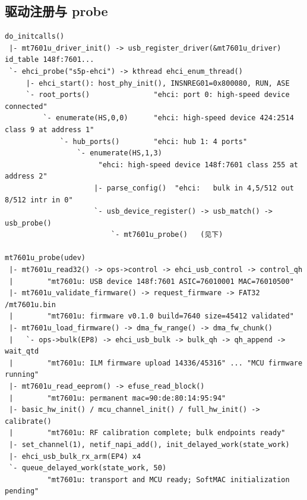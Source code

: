 \subsection{驱动注册与 probe}
\begin{lstlisting}
do_initcalls()
 |- mt7601u_driver_init() -> usb_register_driver(&mt7601u_driver)   id_table 148f:7601...
 `- ehci_probe("s5p-ehci") -> kthread ehci_enum_thread()
     |- ehci_start(): host_phy_init(), INSNREG01=0x800080, RUN, ASE
     `- root_ports()               "ehci: port 0: high-speed device connected"
         `- enumerate(HS,0,0)      "ehci: high-speed device 424:2514 class 9 at address 1"
             `- hub_ports()        "ehci: hub 1: 4 ports"
                 `- enumerate(HS,1,3)
                      "ehci: high-speed device 148f:7601 class 255 at address 2"
                     |- parse_config()  "ehci:   bulk in 4,5/512 out 8/512 intr in 0"
                     `- usb_device_register() -> usb_match() -> usb_probe()
                         `- mt7601u_probe()   (见下)

mt7601u_probe(udev)
 |- mt7601u_read32() -> ops->control -> ehci_usb_control -> control_qh
 |        "mt7601u: USB device 148f:7601 ASIC=76010001 MAC=76010500"
 |- mt7601u_validate_firmware() -> request_firmware -> FAT32 /mt7601u.bin
 |        "mt7601u: firmware v0.1.0 build=7640 size=45412 validated"
 |- mt7601u_load_firmware() -> dma_fw_range() -> dma_fw_chunk()
 |   `- ops->bulk(EP8) -> ehci_usb_bulk -> bulk_qh -> qh_append -> wait_qtd
 |        "mt7601u: ILM firmware upload 14336/45316" ... "MCU firmware running"
 |- mt7601u_read_eeprom() -> efuse_read_block()
 |        "mt7601u: permanent mac=90:de:80:14:95:94"
 |- basic_hw_init() / mcu_channel_init() / full_hw_init() -> calibrate()
 |        "mt7601u: RF calibration complete; bulk endpoints ready"
 |- set_channel(1), netif_napi_add(), init_delayed_work(state_work)
 |- ehci_usb_bulk_rx_arm(EP4) x4
 `- queue_delayed_work(state_work, 50)
          "mt7601u: transport and MCU ready; SoftMAC initialization pending"
\end{lstlisting}

